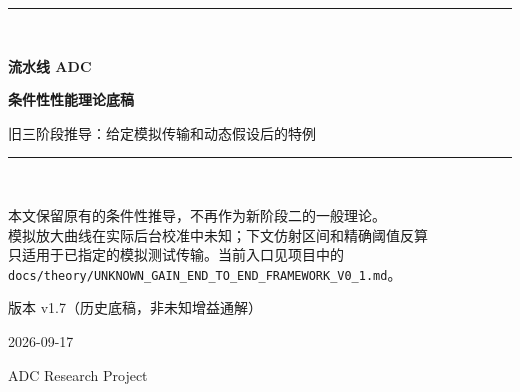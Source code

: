 \documentclass[11pt,a4paper]{ctexart}
\theoremstyle{adcplain}
\theoremstyle{definition}
\begin{document}

\begin{titlepage}
  \centering
  \vspace*{19mm}
  {\color{FrameworkBlue}\rule{0.82\textwidth}{1.2pt}}\\[12mm]
  {\fontsize{24}{32}\selectfont\bfseries 流水线 ADC\par}
  \vspace{3mm}
  {\fontsize{22}{30}\selectfont\bfseries 条件性性能理论底稿\par}
  \vspace{7mm}
  {\large 旧三阶段推导：给定模拟传输和动态假设后的特例\par}
  \vspace{12mm}
  {\color{FrameworkBlue}\rule{0.82\textwidth}{1.2pt}}\\[15mm]

  \begin{scopebox}
  \centering
  本文保留原有的条件性推导，不再作为新阶段二的一般理论。\\
  模拟放大曲线在实际后台校准中未知；下文仿射区间和精确阈值反算\\
  只适用于已指定的模拟测试传输。当前入口见项目中的\\
  \texttt{docs/theory/UNKNOWN\_GAIN\_END\_TO\_END\_FRAMEWORK\_V0\_1.md}。
  \end{scopebox}

  \vfill
  {\large 版本 v1.7（历史底稿，非未知增益通解）}\par
  \vspace{2mm}
  {\large 2026-09-17}\par
  \vspace{13mm}
  {\small ADC Research Project}\par
\end{titlepage}
\end{document}
